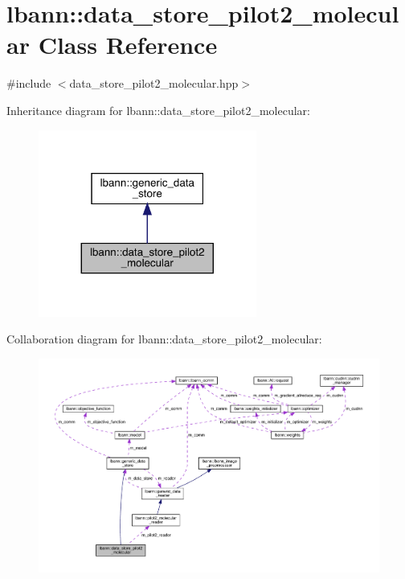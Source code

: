 \hypertarget{classlbann_1_1data__store__pilot2__molecular}{}\section{lbann\+:\+:data\+\_\+store\+\_\+pilot2\+\_\+molecular Class Reference}
\label{classlbann_1_1data__store__pilot2__molecular}


{\ttfamily \#include $<$data\+\_\+store\+\_\+pilot2\+\_\+molecular.\+hpp$>$}



Inheritance diagram for lbann\+:\+:data\+\_\+store\+\_\+pilot2\+\_\+molecular\+:\nopagebreak
\begin{figure}[H]
\begin{center}
\leavevmode
\includegraphics[width=203pt]{classlbann_1_1data__store__pilot2__molecular__inherit__graph}
\end{center}
\end{figure}


Collaboration diagram for lbann\+:\+:data\+\_\+store\+\_\+pilot2\+\_\+molecular\+:\nopagebreak
\begin{figure}[H]
\begin{center}
\leavevmode
\includegraphics[width=350pt]{classlbann_1_1data__store__pilot2__molecular__coll__graph}
\end{center}
\end{figure}
